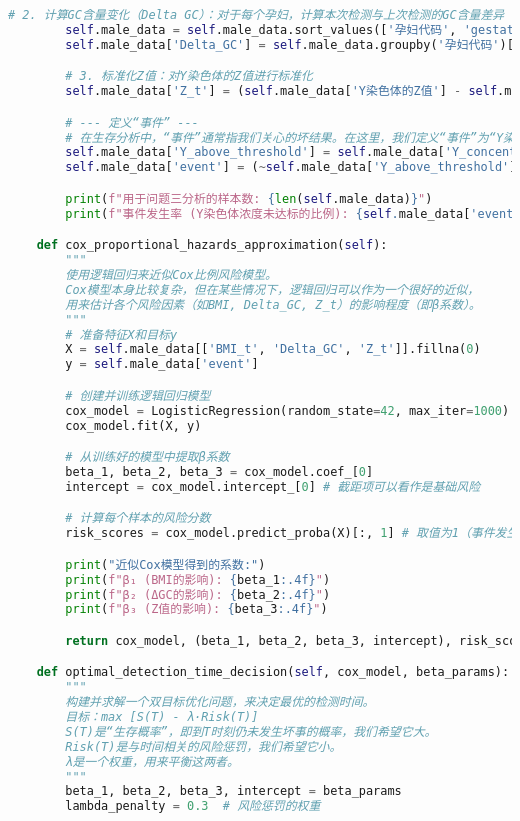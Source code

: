 \documentclass[UTF8, a4paper, 11pt]{ctexart}
\begin{document}
\begin{lstlisting}[language=Python, caption={问题三的解决方案脚本。}]
        # 2. 计算GC含量变化（Delta GC）：对于每个孕妇，计算本次检测与上次检测的GC含量差异
        self.male_data = self.male_data.sort_values(['孕妇代码', 'gestational_week']) # 必须先按孕妇和时间排序
        self.male_data['Delta_GC'] = self.male_data.groupby('孕妇代码')['GC含量'].diff().fillna(0) # .diff()计算差值

        # 3. 标准化Z值：对Y染色体的Z值进行标准化
        self.male_data['Z_t'] = (self.male_data['Y染色体的Z值'] - self.male_data['Y染色体的Z值'].mean()) / self.male_data['Y染色体的Z值'].std()

        # --- 定义“事件” ---
        # 在生存分析中，“事件”通常指我们关心的坏结果。在这里，我们定义“事件”为“Y染色体浓度未能达到4%的阈值”。
        self.male_data['Y_above_threshold'] = self.male_data['Y_concentration'] >= 0.04
        self.male_data['event'] = (~self.male_data['Y_above_threshold']).astype(int)  # event=1表示发生了坏事（未达标）

        print(f"用于问题三分析的样本数: {len(self.male_data)}")
        print(f"事件发生率 (Y染色体浓度未达标的比例): {self.male_data['event'].mean()*100:.2f}%")

    def cox_proportional_hazards_approximation(self):
        """
        使用逻辑回归来近似Cox比例风险模型。
        Cox模型本身比较复杂，但在某些情况下，逻辑回归可以作为一个很好的近似，
        用来估计各个风险因素（如BMI, Delta_GC, Z_t）的影响程度（即β系数）。
        """
        # 准备特征X和目标y
        X = self.male_data[['BMI_t', 'Delta_GC', 'Z_t']].fillna(0)
        y = self.male_data['event']

        # 创建并训练逻辑回归模型
        cox_model = LogisticRegression(random_state=42, max_iter=1000)
        cox_model.fit(X, y)

        # 从训练好的模型中提取β系数
        beta_1, beta_2, beta_3 = cox_model.coef_[0]
        intercept = cox_model.intercept_[0] # 截距项可以看作是基础风险

        # 计算每个样本的风险分数
        risk_scores = cox_model.predict_proba(X)[:, 1] # 取值为1（事件发生）的概率

        print("近似Cox模型得到的系数:")
        print(f"β₁ (BMI的影响): {beta_1:.4f}")
        print(f"β₂ (ΔGC的影响): {beta_2:.4f}")
        print(f"β₃ (Z值的影响): {beta_3:.4f}")

        return cox_model, (beta_1, beta_2, beta_3, intercept), risk_scores

    def optimal_detection_time_decision(self, cox_model, beta_params):
        """
        构建并求解一个双目标优化问题，来决定最优的检测时间。
        目标：max [S(T) - λ·Risk(T)]
        S(T)是“生存概率”，即到T时刻仍未发生坏事的概率，我们希望它大。
        Risk(T)是与时间相关的风险惩罚，我们希望它小。
        λ是一个权重，用来平衡这两者。
        """
        beta_1, beta_2, beta_3, intercept = beta_params
        lambda_penalty = 0.3  # 风险惩罚的权重


\end{lstlisting}
\end{document}
